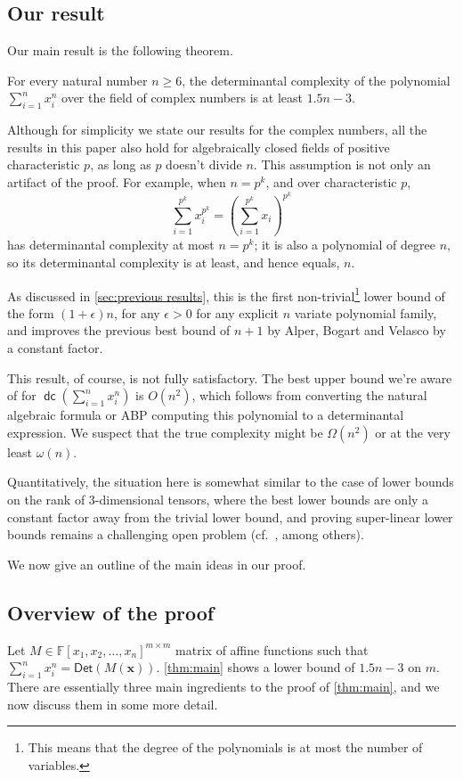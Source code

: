 \documentclass[10pt,a4paper]{article}
\newcommand{\F}{\mathbb{F}}
\newcommand{\vx}{\mathbf{x}}
\newcommand{\Det}{\mathsf{Det}}
\DeclareMathOperator{\dc}{\mathsf{dc}}
\begin{document}
\subsection{Our result}\label{sec:our result}
Our main result is the following theorem. 

\begin{theorem}\label{thm:main}
For every natural number $n \ge 6$, the determinantal complexity of the polynomial  $\sum_{i = 1}^n x_i^n$ over the field of complex numbers  is at least $1.5n - 3$. 
\end{theorem}


Although for simplicity we state our results for the complex numbers, all the results in this paper also hold for algebraically closed fields of positive characteristic $p$, as long as $p$ doesn't divide $n$. This assumption is not only an artifact of the proof. For example, when $n=p^k$, and over characteristic $p$,
\[
\sum_{i=1}^{p^k} x_i^{p^k} = \left( \sum_{i=1}^{p^k} x_i \right)^{p^k}
\]
has determinantal complexity at most $n=p^k$; it is also a polynomial of degree $n$, so its determinantal complexity is at least, and hence equals, $n$.

As discussed in \autoref{sec:previous results}, this is the first non-trivial\footnote{This means that the degree of the polynomials is at most the number of variables.} lower bound of the form $(1 + \epsilon) n$, for any $\epsilon > 0$ for any explicit $n$ variate polynomial family, and improves the previous best bound of $n + 1$ by Alper, Bogart and Velasco \cite{ABV17} by a constant factor.

This result, of course, is not fully satisfactory. The best upper bound we're aware of for $\dc(\sum_{i=1}^n x_i^n)$ is $O(n^2)$, which follows from converting the natural algebraic formula or ABP computing this polynomial to a determinantal expression. We suspect that the true complexity might be $\Omega(n^2)$ or at the very least $\omega(n)$.

Quantitatively, the situation here is somewhat similar to the case of lower bounds on the rank of 3-dimensional tensors, where the best lower bounds are only a constant factor away from the trivial lower bound, and proving super-linear lower bounds remains a challenging open problem (cf.\ \cite{AFT11,BD80,Blaser99,Shpilka01}, among others).

We now give an outline of the main ideas in our proof. 
\subsection{Overview of the proof}
Let $M \in \F[x_1, x_2, \ldots, x_n]^{m \times m}$ matrix of affine functions such that $\sum_{i = 1}^n x_i^n = \Det(M(\vx))$.  \autoref{thm:main} shows a lower bound of $1.5n - 3$ on $m$. There are essentially three main ingredients to the proof of \autoref{thm:main}, and we now discuss them in some more detail. 
\end{document}
